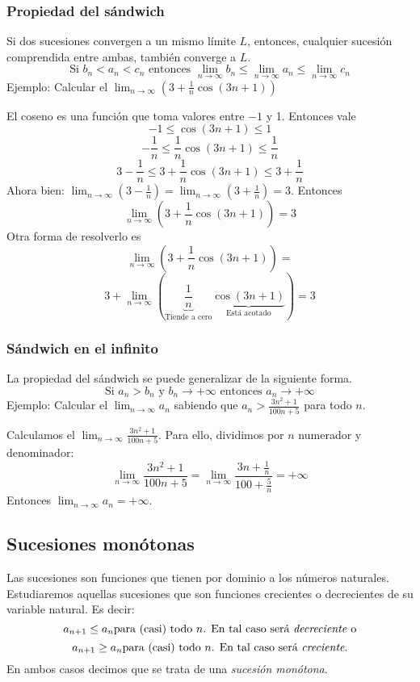 \documentclass[../Teoría.root.tex]{subfiles}
\begin{document}
\subsubsection{Propiedad del sándwich}
Si dos sucesiones convergen a un mismo límite \(L\), entonces, cualquier sucesión comprendida entre ambas, también converge a \(L\).
\[\text{Si }b_n<a_n<c_n\text{ entonces }\lim_{n\to\infty}b_n\leq\lim_{n\to\infty}a_n\leq\lim_{n\to\infty}c_n\]
Ejemplo: Calcular el \(\lim_{n\to\infty}\left(3+\frac{1}{n}\cos(3n+1)\right)\)

El coseno es una función que toma valores entre \(-1\) y 1.
Entonces vale
\[-1\leq\cos(3n+1)\leq1\]
\[-\frac{1}{n}\leq\frac{1}{n}\cos(3n+1)\leq\frac{1}{n}\]
\[3-\frac{1}{n}\leq3+\frac{1}{n}\cos(3n+1)\leq3+\frac{1}{n}\]
Ahora bien: \(\lim_{n\to\infty}\left(3-\frac{1}{n}\right)=\lim_{n\to\infty}\left(3+\frac{1}{n}\right)=3\).
Entonces \[\lim_{n\to\infty}\left(3+\frac{1}{n}\cos(3n+1)\right)=3\]
Otra forma de resolverlo es
\[\lim_{n\to\infty}\left(3+\frac{1}{n}\cos(3n+1)\right)=\]
\[3+\lim_{n\to\infty}\left(\underbrace{\frac{1}{n}}_{\text{Tiende a cero}}\underbrace{\cos(3n+1)}_{\text{Está acotado}}\right)=3\]
\subsubsection{Sándwich en el infinito}
La propiedad del sándwich se puede generalizar de la siguiente forma.
\[\text{Si }a_n>b_n\text{ y }b_n\rightarrow+\infty\text{ entonces }a_n\rightarrow+\infty\]
Ejemplo: Calcular el \(\lim_{n\to\infty}a_n\) sabiendo que \(a_n>\frac{3n^2+1}{100n+5}\) para todo \(n\).

Calculamos el \(\lim_{n\to\infty}\frac{3n^2+1}{100n+5}\).
Para ello, dividimos por \(n\) numerador y denominador:
\[\lim_{n\to\infty}\frac{3n^2+1}{100n+5}=\lim_{n\to\infty}\frac{3n+\frac{1}{n}}{100+\frac{5}{n}}=+\infty\]
Entonces \(\lim_{n\to\infty}a_n=+\infty\).
\subsection{Sucesiones monótonas}
Las sucesiones son funciones que tienen por dominio a los números naturales.
Estudiaremos aquellas sucesiones que son funciones crecientes o decrecientes de su variable natural.
Es decir:
\[a_{n+1}\leq a_n \text{para (casi) todo \(n\). En tal caso será \textit{decreciente} o}\]
\[a_{n+1}\geq a_n \text{para (casi) todo \(n\). En tal caso será \textit{creciente}.}\]
En ambos casos decimos que se trata de una \textit{sucesión monótona}.
\end{document}
